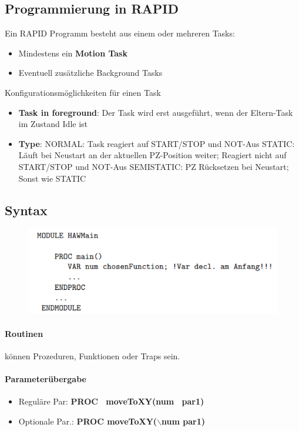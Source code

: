 \subsection{Programmierung in RAPID}
Ein RAPID Programm besteht aus einem oder mehreren Tasks:
\begin{itemize}
	\item Mindestens ein \textbf{Motion Task}
	\item Eventuell zusätzliche Background Tasks
\end{itemize}
Konfigurationsmöglichkeiten für einen Task
\begin{itemize}
	\item \textbf{Task in foreground}: Der Task wird erst ausgeführt, wenn der Eltern-Task im Zustand Idle ist
	\item \textbf{Type}:
	\subitem NORMAL: Task reagiert auf START/STOP und NOT-Aus
	\subitem STATIC: Läuft bei Neustart an der aktuellen PZ-Position weiter; Reagiert nicht auf START/STOP und NOT-Aus
	\subitem SEMISTATIC: PZ Rücksetzen bei Neustart; Sonst wie STATIC
\end{itemize}
\subsection{Syntax}
\begin{figure}[H]
	\begin{center}
		\includegraphics[scale=0.8]{Resources/PNG/Syntax1.PNG}
		\caption{}
		\label{fig:PNG/Syntax1.PNG}
	\end{center}
\end{figure}
\paragraph{Routinen}
können Prozeduren, Funktionen oder Traps sein.
\paragraph{Parameterübergabe}
\begin{itemize}
	\item Reguläre Par: \textbf{PROC \ moveToXY(num \ par1)}
	\item Optionale Par.: \textbf{PROC moveToXY($\backslash$num par1)}
\end{itemize}

